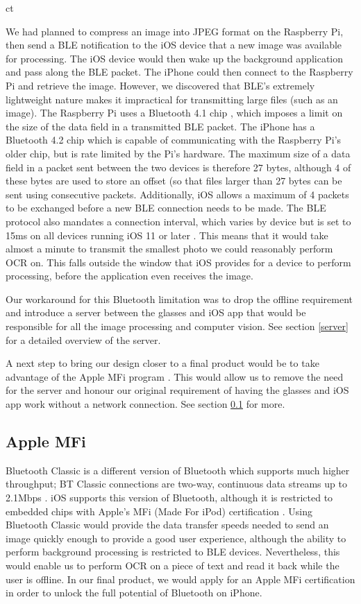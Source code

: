 ct\documentclass[a4paper,11pt]{article}
\begin{document}
We had planned to compress an image into JPEG format on the Raspberry Pi, then send a BLE notification to the iOS device that a new image was available for processing. The iOS device would then wake up the background application and pass along the BLE packet. The iPhone could then connect to the Raspberry Pi and retrieve the image. However, we discovered that BLE's extremely lightweight nature makes it impractical for transmitting large files (such as an image). The Raspberry Pi uses a Bluetooth 4.1 chip \cite{raspi-hardware}, which imposes a limit on the size of the data field in a transmitted BLE packet. The iPhone has a Bluetooth 4.2 chip \cite{iphone-hardware} which is capable of communicating with the Raspberry Pi's older chip, but is rate limited by the Pi's hardware. The maximum size of a data field in a packet sent between the two devices is therefore 27 bytes, although 4 of these bytes are used to store an offset (so that files larger than 27 bytes can be sent using consecutive packets. Additionally, iOS allows a maximum of 4 packets to be exchanged before a new BLE connection needs to be made. The BLE protocol also mandates a connection interval, which varies by device but is set to 15ms on all devices running iOS 11 or later \cite{apple-bluetooth}. This means that it would take almost a minute to transmit the smallest photo we could reasonably perform OCR on. This falls outside the window that iOS provides for a device to perform processing, before the application even receives the image.

Our workaround for this Bluetooth limitation was to drop the offline requirement and introduce a server between the glasses and iOS app that would be responsible for all the image processing and computer vision. See section \ref{server} for a detailed overview of the server.

A next step to bring our design closer to a final product would be to take advantage of the Apple MFi program \cite{apple-mfi}. This would allow us to remove the need for the server and honour our original requirement of having the glasses and iOS app work without a network connection. See section \ref{apple-mfi} for more.

\subsection{Apple MFi}
\label{apple-mfi}
Bluetooth Classic is a different version of Bluetooth which supports much higher throughput; BT Classic connections are two-way, continuous data streams up to 2.1Mbps \cite{bluetooth-classic}. iOS supports this version of Bluetooth, although it is restricted to embedded chips with Apple's MFi (Made For iPod) certification \cite{apple-mfi}. Using Bluetooth Classic would provide the data transfer speeds needed to send an image quickly enough to provide a good user experience, although the ability to perform background processing is restricted to BLE devices. Nevertheless, this would enable us to perform OCR on a piece of text and read it back while the user is offline. In our final product, we would apply for an Apple MFi certification in order to unlock the full potential of Bluetooth on iPhone.
\end{document}
